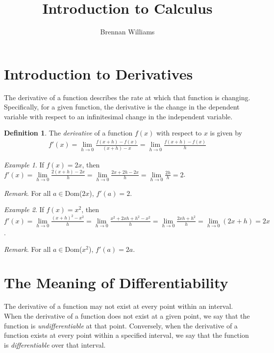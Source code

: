 \documentclass{article}
\title{Introduction to Calculus}
\author{Brennan Williams}
\date{}
\theoremstyle{plain}
\theoremstyle{definition}
\newtheorem{definition}{Definition}
\theoremstyle{remark}
\newtheorem{example}{Example}
\begin{document}
\maketitle

\section{Introduction to Derivatives}
The derivative of a function describes the rate at which that function is changing. \;Specifically, for a given function, the derivative is the change in the dependent variable with respect to an infinitesimal change in the independent variable.
\begin{definition}
    The \textit{derivative} of a function $f(x)$ with respect to $x$ is given by
    \begin{align*}
        f'(x)=\lim\limits_{h\to0} \frac{f(x+h)-f(x)}{(x+h)-x}=\lim\limits_{h\to0} \frac{f(x+h)-f(x)}{h} 
    \end{align*} 
\end{definition}

\begin{example}
    If $f(x)=2x$, then $f'(x)=\lim\limits_{h\to0}\frac{2(x+h)-2x}{h}=\lim\limits_{h\to0}\frac{2x+2h-2x}{h}=\lim\limits_{h\to0}\frac{2h}{h}=2$.
\end{example}

\textit{Remark}. \;For all $a\in$\;Dom\;($2x$), $f'(a)=2$.\\

\begin{example}
    If $f(x)=x^2$, then $f'(x)=\lim\limits_{h\to0}\frac{(x+h)^2-x^2}{h}=\lim\limits_{h\to0}\frac{x^2
    +2xh+h^2-x^2}{h}=\lim\limits_{h\to0}\frac{2xh+h^2}{h}=\lim\limits_{h\to0}(2x+h)=2x$.
\end{example}

\textit{Remark}. \;For all $a\in$\;Dom\;($x^2$), $f'(a)=2a$.

\section{The Meaning of Differentiability}
\noindent The derivative of a function may not exist at every point within an interval. \;When the derivative of a function does not exist at a given point, we say that the function is \textit{undifferentiable} at that point. \;Conversely, when the derivative of a function exists at every point within a specified interval, we say that the function is \textit{differentiable} over that interval.
\end{document}
